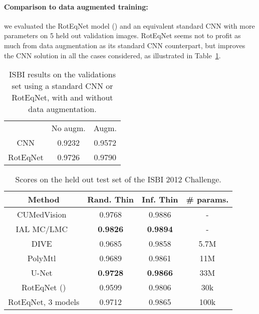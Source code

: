 \documentclass[10pt,twocolumn,letterpaper,table]{article}
\begin{document}
  \paragraph{Comparison to data augmented training:} we evaluated the RotEqNet model () and an equivalent standard CNN with  more parameters on 5 held out validation images. RotEqNet seems not to profit as much from data augmentation as its standard CNN counterpart, but improves the CNN solution in all the cases considered, as illustrated in Table~\ref{tab:ISBI_aug}.
\begin{table}[h!]
\centering

\label{tab:ISBI_aug}
{\footnotesize
\begin{tabular}{c|c|c|}
\cline{2-3}
& No augm. & Augm. \\
\cline{1-3}
\multicolumn{1}{|c|}{CNN} & 0.9232 & 0.9572 \\
\cline{1-3}
\multicolumn{1}{|c|}{RotEqNet} & 0.9726 & 0.9790 \\
\cline{1-3}
\end{tabular}
}
\vspace*{1mm}
\caption{ISBI results on the validations set using a standard CNN or RotEqNet, with and without data augmentation.}
\end{table}


\begin{table}[!t]
\vspace*{-2mm}
  \centering
{\footnotesize
\begin{tabular}{|c|c|c|c|}
\hline \textbf{Method} & \textbf{Rand. Thin} & 	\textbf{Inf. Thin} & \# params.\\ 
\hline CUMedVision~\cite{chen2016deep} & 0.9768 & 0.9886 & -\\
IAL MC/LMC~\cite{beier2016efficient} & \textbf{0.9826} & \textbf{0.9894} & -\\
\hline 
DIVE~\cite{fakhry2016deep} & 0.9685 & 0.9858 & 5.7M\\
PolyMtl~\cite{drozdzal2016importance} & 0.9689 & 0.9861 & 11M\\			
U-Net~\cite{ronneberger2015u} & \textbf{0.9728} & \textbf{0.9866} & 33M\\
\hline RotEqNet () & 0.9599 & 0.9806 & 30k\\
RotEqNet, 3 models & 0.9712 & 0.9865 & 100k\\
\hline 
\end{tabular}
}
\vspace{0.1cm}
\caption{Scores on the held out test set of the ISBI 2012 Challenge. }
\label{tab:isbi}
\end{table}
	
\end{document}
